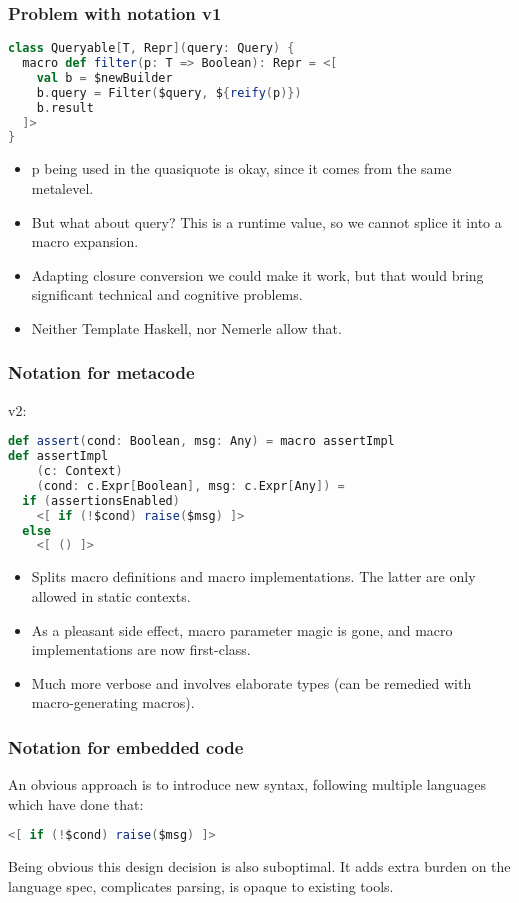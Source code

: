 \documentclass[hyperref={bookmarks=false}]{beamer}
\begin{document}
\begin{frame}[fragile]
\frametitle{Problem with notation v1}
\begin{lstlisting}[language=scala]
class Queryable[T, Repr](query: Query) {
  macro def filter(p: T => Boolean): Repr = <[
    val b = $newBuilder
    b.query = Filter($query, ${reify(p)})
    b.result
  ]>
}
\end{lstlisting}

\begin{itemize}
\item p being used in the quasiquote is okay, since it comes from the same metalevel.
\item But what about query? This is a runtime value, so we cannot splice it into a macro expansion.
\item Adapting closure conversion we could make it work, but that would bring significant technical and cognitive problems.
\item Neither Template Haskell, nor Nemerle allow that.
\end{itemize}
\end{frame}

\begin{frame}[fragile]
\frametitle{Notation for metacode}

v2:
\begin{lstlisting}[language=scala]
def assert(cond: Boolean, msg: Any) = macro assertImpl
def assertImpl
    (c: Context)
    (cond: c.Expr[Boolean], msg: c.Expr[Any]) =
  if (assertionsEnabled)
    <[ if (!$cond) raise($msg) ]>
  else
    <[ () ]>
\end{lstlisting}

\begin{itemize}
\item Splits macro definitions and macro implementations. The latter are only allowed in static contexts.
\item As a pleasant side effect, macro parameter magic is gone, and macro implementations are now first-class.
\item Much more verbose and involves elaborate types (can be remedied with macro-generating macros).
\end{itemize}
\end{frame}

\begin{frame}[fragile]
\frametitle{Notation for embedded code}

An obvious approach is to introduce new syntax, following multiple languages which have done that:

\begin{lstlisting}[language=scala]
<[ if (!$cond) raise($msg) ]>
\end{lstlisting}

Being obvious this design decision is also suboptimal. It adds extra burden on the language spec, complicates parsing, is opaque to existing tools.
\end{frame}
\end{document}
